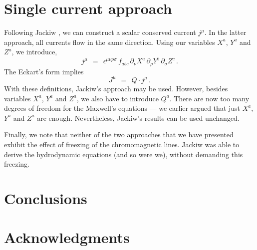 \documentclass[epsfig,12pt]{article}
\def\beq{\begin{equation}}
\def\eeq{\end{equation}}
\newcommand{\p}{\partial}
\begin{document}
\section{Single current approach}
	Following Jackiw \cite{}, we can construct a scalar conserved current $ j^\mu $.
	In the latter approach, all currents flow in the same direction. 
	Using our variables $ X^a $, $ Y^a $ and $ Z^a $, we introduce,
\beq
	j^\mu    ~~=~~    \epsilon^{\mu\nu\rho\sigma}\, f_{abc}\, \p_\nu X^a\, \p_\rho Y^b\, \p_\sigma Z^c\,.
\eeq
	The Eckart's form \cite{} implies\,
\beq
	J^\mu    ~~=~~    Q \cdot j^\mu\,.
\eeq
	With these definitions, Jackiw's approach may be used.
	However, besides variables $ X^a $, $ Y^a $ and $ Z^a $, we also have to introduce $ Q^a $.
	There are now too many degrees of freedom for the Maxwell's equations --- we earlier
	argued that just $ X^a $, $ Y^a $ and $ Z^a $ are enough.
	Nevertheless, Jackiw's results can be used unchanged.




\vspace{1cm}
	Finally, we note that neither of the two approaches that we have presented exhibit the effect
	of freezing of the chromomagnetic lines.
	Jackiw was able to derive the hydrodynamic equations (and so were we), without demanding
	this freezing.
	



\section{Conclusions}




\section*{Acknowledgments}

\small
\begin{thebibliography}{99}
\itemsep -2pt

\end{thebibliography}
\end{document}
